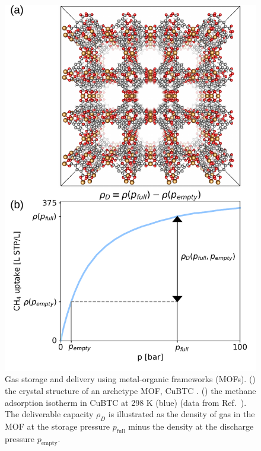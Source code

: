 \documentclass[twoside,twocolumn,9pt]{article}
\newcommand\pfull{\ensuremath{p_{\text{full}}}}
\newcommand\pempty{\ensuremath{p_{\text{empty}}}}
\begin{document}
\begin{figure}
    \centering
    \includegraphics[width=0.8\columnwidth]{Combine_Figure.pdf}
    \begin{minipage}{0.25\textwidth}
    \end{minipage}
    \begin{minipage}{0.25\textwidth}
    \end{minipage}
    
    \caption{\label{fig:fig1} Gas storage and delivery using metal-organic frameworks (MOFs). () the crystal structure of an archetype MOF, CuBTC \cite{chui1999chemically}. () the methane adsorption isotherm in CuBTC \cite{chui1999chemically} at 298 K (blue) (data from Ref.~\cite{mason2014evaluating}). The deliverable capacity $\rho_D$ is illustrated as the density of gas in the MOF at the storage pressure $\pfull$ minus the density at the discharge pressure $\pempty$.}
\end{figure}
\end{document}
